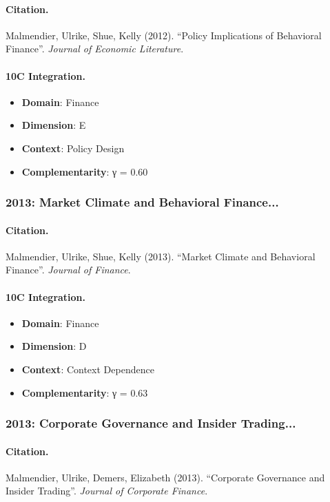 \paragraph{Citation.}
Malmendier, Ulrike, Shue, Kelly (2012). ``Policy Implications of Behavioral Finance''. \textit{Journal of Economic Literature}.

\paragraph{10C Integration.}
\begin{itemize}[nosep]
  \item \textbf{Domain}: Finance
  \item \textbf{Dimension}: E
  \item \textbf{Context}: Policy Design
  \item \textbf{Complementarity}: γ = 0.60
\end{itemize}


\subsubsection{2013: Market Climate and Behavioral Finance...}

\paragraph{Citation.}
Malmendier, Ulrike, Shue, Kelly (2013). ``Market Climate and Behavioral Finance''. \textit{Journal of Finance}.

\paragraph{10C Integration.}
\begin{itemize}[nosep]
  \item \textbf{Domain}: Finance
  \item \textbf{Dimension}: D
  \item \textbf{Context}: Context Dependence
  \item \textbf{Complementarity}: γ = 0.63
\end{itemize}


\subsubsection{2013: Corporate Governance and Insider Trading...}

\paragraph{Citation.}
Malmendier, Ulrike, Demers, Elizabeth (2013). ``Corporate Governance and Insider Trading''. \textit{Journal of Corporate Finance}.

